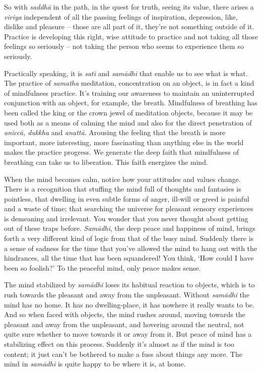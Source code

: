 So with \emph{saddhā} in the path, in the quest for truth, seeing its
value, there arises a \emph{viriya} independent of all the passing
feelings of inspiration, depression, like, dislike and pleasure --
those are all part of it, they're not something outside of it. Practice
is developing this right, wise attitude to practice and not taking all
those feelings so seriously -- not taking the person who seems to
experience them so seriously. 

Practically speaking, it is \emph{sati} and \emph{samādhi} that enable
us to see what is what. The practice of \emph{samatha} meditation, 
concentration on an object, is in fact a kind of mindfulness practice. 
It's training our awareness to maintain an uninterrupted conjunction
with an object, for example, the breath. Mindfulness of breathing has
been called the king or the crown jewel of meditation objects, because
it may be used both as a means of calming the mind and also for the
direct penetration of \emph{aniccā, dukkha} and \emph{anattā}. Arousing
the feeling that the breath is more important, more interesting, more
fascinating than anything else in the world makes the practice progress. 
We generate the deep faith that mindfulness of breathing can take us to
liberation. This faith energizes the mind. 

When the mind becomes calm, notice how your attitudes and values change. 
There is a recognition that stuffing the mind full of thoughts and
fantasies is pointless, that dwelling in even subtle forms of anger, 
ill-will or greed is painful and a waste of time; that searching the
universe for pleasant sensory experiences is demeaning and irrelevant. 
You wonder that you never thought about getting out of these traps
before. \emph{Samādhi}, the deep peace and happiness of mind, brings
forth a very different kind of logic from that of the busy mind. 
Suddenly there is a sense of sadness for the time that you've allowed
the mind to hang out with the hindrances, all the time that has been
squandered! You think, `How could I have been so foolish?' To the
peaceful mind, only peace makes sense. 

The mind stabilized by \emph{samādhi} loses its habitual reaction to
objects, which is to rush towards the pleasant and away from the
unpleasant. Without \emph{samādhi} the mind has no home. It has no
dwelling-place, it has nowhere it really wants to be. And so when faced
with objects, the mind rushes around, moving towards the pleasant and
away from the unpleasant, and hovering around the neutral, not quite
sure whether to move towards it or away from it. But peace of mind has a
stabilizing effect on this process. Suddenly it's almost as if the mind
is too content; it just can't be bothered to make a fuss about things
any more. The mind in \emph{samādhi} is quite happy to be where it is, 
at home. 

